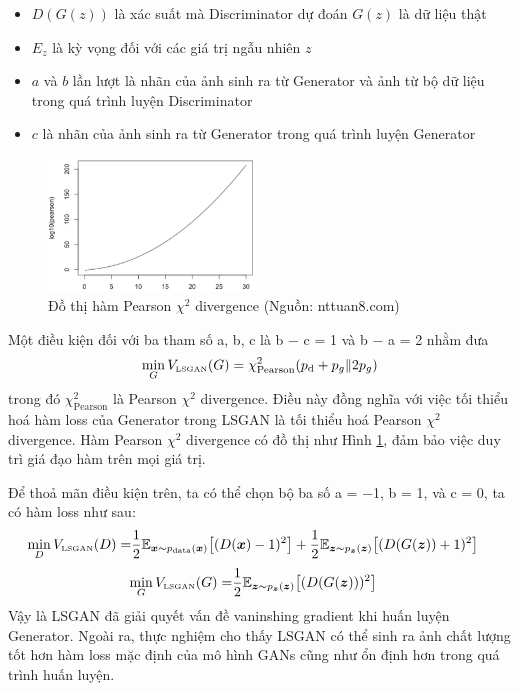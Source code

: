 {\begin{itemize}[leftmargin=0cm,itemindent=.5cm,labelwidth=\itemindent,labelsep=0cm,align=left]
        \item $D(G(z))$ là xác suất mà Discriminator dự đoán $G(z)$ là dữ liệu thật
        \item $E_z$ là kỳ vọng đối với các giá trị ngẫu nhiên $z$
        \item $a$ và $b$ lần lượt là nhãn của ảnh sinh ra từ Generator và ảnh từ bộ dữ liệu trong quá trình luyện Discriminator
        \item $c$ là nhãn của ảnh sinh ra từ Generator trong quá trình luyện Generator
    \end{itemize}
    \begin{figure}[H]
    \centering
    \includegraphics[width=5.5cm] {images/pearson.png}
    \caption{Đồ thị hàm Pearson $\chi^2$ divergence (Nguồn: nttuan8.com)}
    \label{fig:pearson}
    \end{figure}
    Một điều kiện đối với ba tham số a, b, c là b − c = 1 và b − a = 2 nhằm đưa 
    \begin{equation}
    \min_G V_{\text{\tiny LSGAN}}(G) = \chi^2_\text{Pearson}(p_\text{d}+p_g\|2p_g)
    \end{equation}
    trong đó $\chi^2_\text{Pearson}$  là Pearson $\chi^2$ divergence. Điều này đồng nghĩa với việc tối thiểu hoá hàm loss của Generator trong LSGAN là tối thiểu hoá Pearson $\chi^2$ divergence. Hàm Pearson $\chi^2$ divergence có đồ thị như Hình \ref{fig:pearson}, đảm bảo việc duy trì giá đạo hàm trên mọi giá trị.

    \noindent Để thoả mãn điều kiện trên, ta có thể chọn bộ ba số a = −1, b = 1, và c = 0, ta có hàm loss như sau:
    \begin{align}
    \min_D V_{\text{\tiny LSGAN}}(D) = &\frac{1}{2}\mathbb{E}_{\bm{x} \sim p_{\text{data}}(\bm{x})}\bigl[(D(\bm{x})-1)^2\bigr]+ \frac{1}{2}\mathbb{E}_{\bm{z} \sim p_{\bm{z}}(\bm{z})}\bigl[(D(G(\bm{z}))+1)^2\bigr]
    \end{align}
    \begin{align}
    \min_G V_{\text{\tiny LSGAN}}(G) = &\frac{1}{2}\mathbb{E}_{\bm{z} \sim p_{\bm{z}}(\bm{z})}\bigl[(D(G(\bm{z})))^2\bigr]
    \end{align}
    Vậy là LSGAN đã giải quyết vấn đề vaninshing gradient khi huấn luyện Generator. Ngoài ra, thực nghiệm cho thấy LSGAN có thể sinh ra ảnh chất lượng tốt hơn hàm loss mặc định của mô hình GANs cũng như ổn định hơn trong quá trình huấn luyện.
    
}
